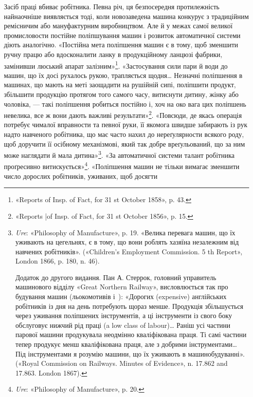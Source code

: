 Засіб праці вбиває робітника. Певна річ, ця безпосередня
протилежність найнаочніше виявляється тоді, коли новозаведена
машина конкурує з традиційним ремісничим або мануфактурним
виробництвом. Але й у межах самої великої промисловости постійне
поліпшування машин і розвиток автоматичної системи діють аналогічно.
«Постійна мета поліпшення машин є в тому, щоб зменшити
ручну працю або вдосконалити ланку в продукційному
ланцюзі фабрики, замінивши люський апарат залізним»\footnote{
«Reports of Insp. of Fact, for 31 st October 1858», p. 43.
}.
«Застосування сили пари й води до машин, що їх досі рухалось
рукою, трапляється щодня\dots{} Незначні поліпшення в машинах,
що мають на меті заощадити на рушійній сипі, поліпшити продукт,
збільшити продукцію протягом того самого часу, витиснути дитину,
жінку або чоловіка, — такі поліпшення робиться постійно
і, хоч на око вага цих поліпшень невелика, все ж вони дають
важливі результати»\footnote{
«Reports |of Insp. of Fact, for 31 st October 1856», p. 15.
}. «Повсюди, де якась операція потребує
чималої вправности та певної руки, її якомога швидше забирають
із рук надто навченого робітника, що має часто нахил до нереґулярности
всякого роду, щоб доручити її осібному механізмові,
який так добре вреґульований, що за ним може наглядати й
мала дитина»\footnote{
\emph{Ure}: «Philosophy of Manufacture», p. 19. «Велика перевага
машин, що їх уживають на цегельнях, є в тому, що вони роблять хазяїна
незалежним від навчених робітників». («Children’s Employment Commission.
5 th Report», London 1866, p. 180, n. 46).

Додаток до другого видання. Пан А. Стеррок, головний управитель
машинового відділу «Great Northern Railway», висловлюється так про
будування машин (льокомотивів і~): «Дорогих (expensive) англійських
робітників із дня на день потребують щораз менше. Продукція збільшується
через уживання поліпшених інструментів, а ці інструменти із свого
боку обслуговує нижчий рід праці (a low class of labour)\dots{} Раніш усі частини
парової машини продукувала неодмінно кваліфікована праця.
Ті самі частини тепер продукує менш кваліфікована праця, але з добрими
інструментами\dots{} Під інструментами я розумію машини, що їх уживають
в машинобудуванні». («Royal Commission on Railways. Minutes of Evidence»,
n. \num{17.862} and \num{17.863}. London 1867).
}. «За автоматичної системи талант робітника проґресивно
витискується»\footnote{
\emph{Ure}: «Philosophy of Manufacture», p. 20.
}. «Поліпшення машин не тільки вимагає
зменшити число дорослих робітників, уживаних, щоб досягти
